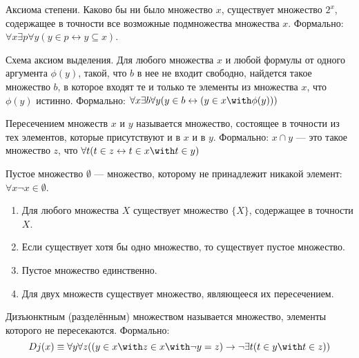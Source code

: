 \begin{axiom}{Аксиома степени.}
Каково бы ни было множество $x$, существует множество $2^x$, содержащее в точности
все возможные подмножества множества $x$.
Формально: $\forall x \exists p \forall y (y \in p \leftrightarrow y \subseteq x)$.
\end{axiom}

\begin{axiom}{Схема аксиом выделения.}
Для любого множества $x$ и любой формулы от одного аргумента $\phi(y)$, такой, что
$b$ в нее не входит свободно, найдется такое множество $b$, в которое
входят те и только те элементы из множества $x$, что $\phi(y)$ истинно.
Формально: $\forall x \exists b \forall y (y \in b \leftrightarrow (y \in x \with \phi(y)))$
\end{axiom}

\begin{definition}Пересечением множеств $x$ и $y$ называется множество, состоящее
в точности из тех элементов, которые присутствуют и в $x$ и в $y$. Формально:
$x \cap y$ --- это такое множество $z$, что $\forall t (t \in z \leftrightarrow t \in x \with t \in y)$
\end{definition}

\begin{definition}Пустое множество $\emptyset$ --- множество, которому не принадлежит
никакой элемент: $\forall x \neg x \in \emptyset$.
\end{definition}

\begin{theorem}\begin{enumerate}
\item Для любого множества $X$ существует множество $\{X\}$, содержащее в точности $X$.
\item Если существует хотя бы одно множество, то существует пустое множество.
\item Пустое множество единственно.
\item Для двух множеств существует множество, являющееся их пересечением.
\end{enumerate}\end{theorem}

\begin{definition}Дизъюнктным (разделённым) множеством называется множество, элементы которого
не пересекаются. Формально:
$$Dj(x) \equiv \forall y \forall z ((y \in x \with z \in x \with \neg y=z) \rightarrow 
\neg \exists t (t \in y \with t \in z))$$
\end{definition}

